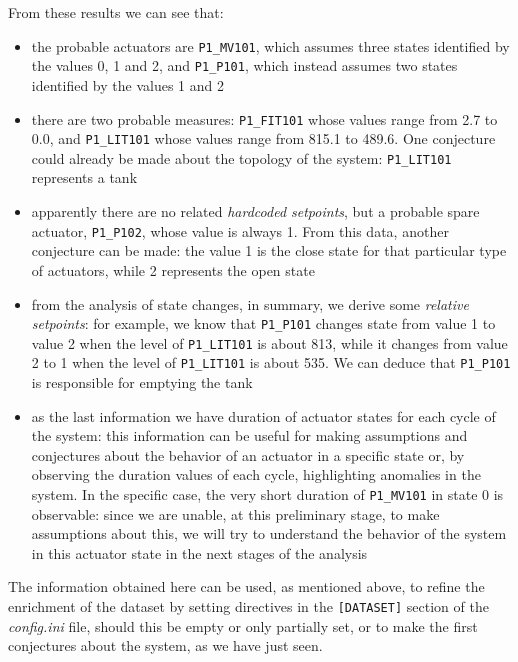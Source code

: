 From these results we can see that: 

\begin{itemize}
	\item the probable actuators are \texttt{P1\_MV101}, which assumes three states identified by the values 0, 1 and 2, and \texttt{P1\_P101}, which instead assumes two states identified by the values 1 and 2
	
	\item there are two probable measures: \texttt{P1\_FIT101} whose values range from 2.7 to 0.0, and \texttt{P1\_LIT101} whose values range from 815.1 to 489.6. One conjecture could already be made about the topology of the system: \texttt{P1\_LIT101} represents a tank
		
	\item apparently there are no related \textit{hardcoded setpoints}, but a probable spare actuator, \texttt{P1\_P102}, whose value is always 1. From this data, another conjecture can be made: the value 1 is the close state for that particular type of actuators, while 2 represents the open state
	
	\item from the analysis of state changes, in summary, we derive some \textit{relative setpoints}: for example, we know that \texttt{P1\_P101} changes state from value 1 to value 2 when the level of \texttt{P1\_LIT101} is about 813, while it changes from value 2 to 1 when the level of \texttt{P1\_LIT101} is about 535. We can deduce that \texttt{P1\_P101} is responsible for emptying the tank	
	
	\item as the last information we have duration of actuator states for each cycle of the system: this information can be useful for making assumptions and conjectures about the behavior of an actuator in a specific state or, by observing the duration values of each cycle, highlighting anomalies in the system.\newline
	In the specific case, the very short duration of \texttt{P1\_MV101} in state 0 is observable: since we are unable, at this preliminary stage, to make assumptions about this, we will try to understand the behavior of the system in this actuator state in the next stages of the analysis
\end{itemize}

The information obtained here can be used, as mentioned above, to refine the enrichment of the dataset by setting directives in the \texttt{[DATASET]} section of the \textit{config.ini} file, should this be empty or only partially set, or to make the first conjectures about the system, as we have just seen.

